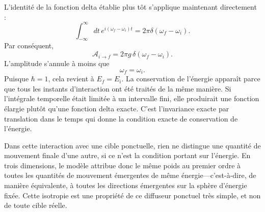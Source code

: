 L’identité de la fonction delta établie plus tôt s’applique maintenant directement :
\begin{equation}
\int_{-\infty}^{\infty}dt\,
e^{i(\omega_f-\omega_i)t}
=2\pi\delta(\omega_f-\omega_i).
\end{equation}
Par conséquent,
\begin{equation}
\boxed{
\mathcal A_{i\to f}
=2\pi g\,\delta(\omega_f-\omega_i)
}.
\end{equation}
L’amplitude s’annule à moins que
\begin{equation}
\omega_f=\omega_i.
\end{equation}
Puisque \(\hbar=1\), cela revient à \(E_f=E_i\). La conservation de l’énergie apparaît parce que tous les instants d’interaction ont été traités de la même manière. Si l’intégrale temporelle était limitée à un intervalle fini, elle produirait une fonction élargie plutôt qu’une fonction delta exacte. C’est l’invariance exacte par translation dans le temps qui donne la condition exacte de conservation de l’énergie.

\begin{classroomqa}\end{classroomqa}


Dans cette interaction avec une cible ponctuelle, rien ne distingue une quantité de mouvement finale d’une autre, si ce n’est la condition portant sur l’énergie. En trois dimensions, le modèle attribue donc le même poids au premier ordre à toutes les quantités de mouvement émergentes de même énergie---c’est-à-dire, de manière équivalente, à toutes les directions émergentes sur la sphère d’énergie fixée. Cette isotropie est une propriété de ce diffuseur ponctuel très simple, et non de toute cible réelle.

